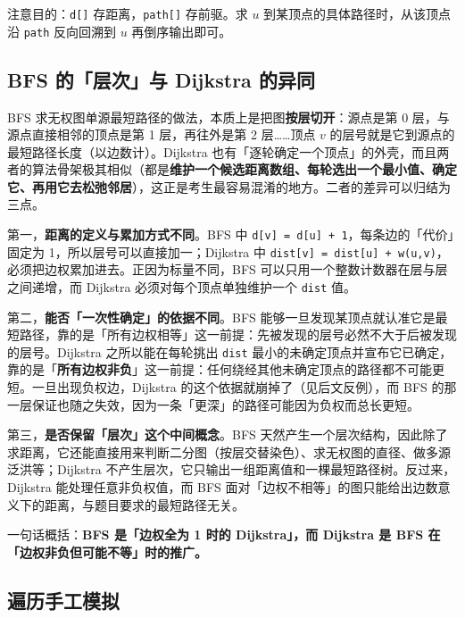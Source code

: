 \documentclass[11pt,openany,UTF8]{ctexbook}
\begin{document}
注意目的：\texttt{d[]\allowbreak{}} 存距离，\texttt{path[]\allowbreak{}} 存前驱。求 $u$ 到某顶点的具体路径时，从该顶点沿 \texttt{path} 反向回溯到 $u$ 再倒序输出即可。

\subsection{BFS 的「层次」与 Dijkstra 的异同}

BFS 求无权图单源最短路径的做法，本质上是把图\textbf{按层切开}：源点是第 0 层，与源点直接相邻的顶点是第 1 层，再往外是第 2 层……顶点 $v$ 的层号就是它到源点的最短路径长度（以边数计）。Dijkstra 也有「逐轮确定一个顶点」的外壳，而且两者的算法骨架极其相似（都是\textbf{维护一个候选距离数组、每轮选出一个最小值、确定它、再用它去松弛邻居}），这正是考生最容易混淆的地方。二者的差异可以归结为三点。

第一，\textbf{距离的定义与累加方式不同}。BFS 中 \texttt{d[v]\allowbreak{} =\allowbreak{} d[u]\allowbreak{} +\allowbreak{} 1}，每条边的「代价」固定为 1，所以层号可以直接加一；Dijkstra 中 \texttt{dist[v]\allowbreak{} =\allowbreak{} dist[u]\allowbreak{} +\allowbreak{} w(u,\allowbreak{}v)\allowbreak{}}，必须把边权累加进去。正因为标量不同，BFS 可以只用一个整数计数器在层与层之间递增，而 Dijkstra 必须对每个顶点单独维护一个 \texttt{dist} 值。

第二，\textbf{能否「一次性确定」的依据不同}。BFS 能够一旦发现某顶点就认准它是最短路径，靠的是「所有边权相等」这一前提：先被发现的层号必然不大于后被发现的层号。Dijkstra 之所以能在每轮挑出 \texttt{dist} 最小的未确定顶点并宣布它已确定，靠的是「\textbf{所有边权非负}」这一前提：任何绕经其他未确定顶点的路径都不可能更短。一旦出现负权边，Dijkstra 的这个依据就崩掉了（见后文反例），而 BFS 的那一层保证也随之失效，因为一条「更深」的路径可能因为负权而总长更短。

第三，\textbf{是否保留「层次」这个中间概念}。BFS 天然产生一个层次结构，因此除了求距离，它还能直接用来判断二分图（按层交替染色）、求无权图的直径、做多源泛洪等；Dijkstra 不产生层次，它只输出一组距离值和一棵最短路径树。反过来，Dijkstra 能处理任意非负权值，而 BFS 面对「边权不相等」的图只能给出边数意义下的距离，与题目要求的最短路径无关。

一句话概括：\textbf{BFS 是「边权全为 1 时的 Dijkstra」，而 Dijkstra 是 BFS 在「边权非负但可能不等」时的推广。}

\subsection{遍历手工模拟}
\end{document}
